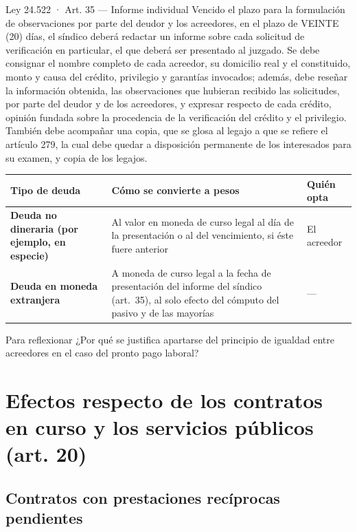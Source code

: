 \documentclass[12pt,oneside]{book}
\begin{document}
\begin{norma}{Ley 24.522 · Art. 35 — Informe individual}
Vencido el plazo para la formulación de observaciones por parte del deudor y los acreedores, en el plazo de VEINTE (20) días, el síndico deberá redactar un informe sobre cada solicitud de verificación en particular, el que deberá ser presentado al juzgado. Se debe consignar el nombre completo de cada acreedor, su domicilio real y el constituido, monto y causa del crédito, privilegio y garantías invocados; además, debe reseñar la información obtenida, las observaciones que hubieran recibido las solicitudes, por parte del deudor y de los acreedores, y expresar respecto de cada crédito, opinión fundada sobre la procedencia de la verificación del crédito y el privilegio. También debe acompañar una copia, que se glosa al legajo a que se refiere el artículo 279, la cual debe quedar a disposición permanente de los interesados para su examen, y copia de los legajos.
\end{norma}

\begingroup
\small
\renewcommand{\arraystretch}{1.25}
\begin{tabularx}{\textwidth}{>{\raggedright\arraybackslash}p{} Y >{\raggedright\arraybackslash}p{0.14\textwidth}}
\toprule
\textbf{Tipo de deuda} & \textbf{Cómo se convierte a pesos} & \textbf{Quién opta} \\
\midrule
\textbf{Deuda no dineraria (por ejemplo, en especie)} & Al valor en moneda de curso legal al día de la presentación o al del vencimiento, si éste fuere anterior & El acreedor \\
\textbf{Deuda en moneda extranjera} & A moneda de curso legal a la fecha de presentación del informe del síndico (art.~35), al solo efecto del cómputo del pasivo y de las mayorías & --- \\
\bottomrule
\end{tabularx}
\endgroup

\begin{exercise}{Para reflexionar}
¿Por qué se justifica apartarse del principio de igualdad entre acreedores en el caso del pronto pago laboral?
\end{exercise}

\section{Efectos respecto de los contratos en curso y los servicios públicos (art. 20)}

\subsection{Contratos con prestaciones recíprocas pendientes}
\end{document}
